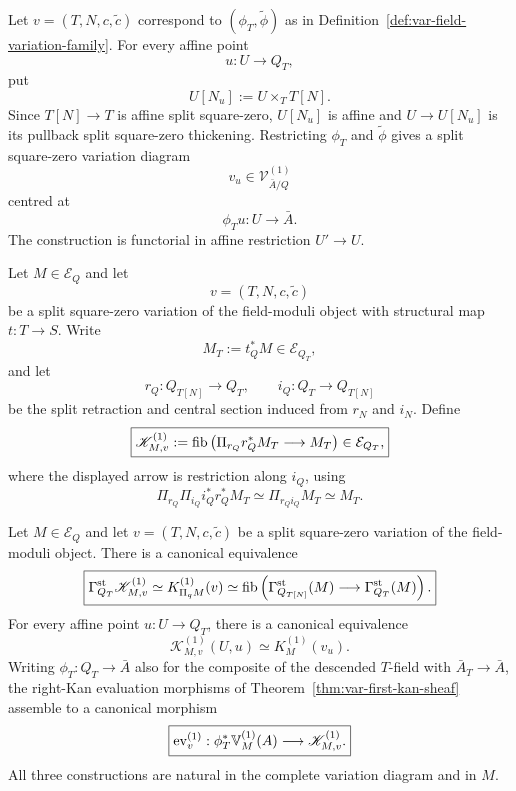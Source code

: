 \begin{construction}
\label{con:var-induced-local-field-variations}
Let \(v=(T,N,c,\widetilde c)\) correspond to \((\phi_T,\widetilde\phi)\) as in Definition~\ref{def:var-field-variation-family}. For every affine point
\[
    u:U\longrightarrow Q_T,
\]
put
\[
    U[N_u]
    :=
    U\times_TT[N].
\]
Since \(T[N]\to T\) is affine split square-zero, \(U[N_u]\) is affine and \(U\to U[N_u]\) is its pullback split square-zero thickening. Restricting \(\phi_T\) and \(\widetilde\phi\) gives a split square-zero variation diagram
\[
    \boxed{
    v_u\in\mathcal V^{(1)}_{\bar A/Q}
    }
\]
centred at
\[
    \phi_Tu:U\longrightarrow\bar A.
\]
The construction is functorial in affine restriction \(U'\to U\).
\end{construction}

\begin{definition}
\label{def:var-parameterized-first-field-difference}
Let \(M\in\mathcal E_Q\) and let
\[
    v=(T,N,c,\widetilde c)
\]
be a split square-zero variation of the field-moduli object with structural map \(t:T\to S\). Write
\[
    M_T:=t_Q^*M\in\mathcal E_{Q_T},
\]
and let
\[
    r_Q:Q_{T[N]}\longrightarrow Q_T,
    \qquad
    i_Q:Q_T\longrightarrow Q_{T[N]}
\]
be the split retraction and central section induced from \(r_N\) and \(i_N\). Define
\[
    \boxed{
    \mathscr K^{(1)}_{M,v}
    :=
    \operatorname{fib}\left(
      \Pi_{r_Q}r_Q^*M_T
      \longrightarrow
      M_T
    \right)
    \in\mathcal E_{Q_T},
    }
\]
where the displayed arrow is restriction along \(i_Q\), using
\[
    \Pi_{r_Q}\Pi_{i_Q}i_Q^*r_Q^*M_T
    \simeq
    \Pi_{r_Qi_Q}M_T
    \simeq
    M_T.
\]
\end{definition}

\begin{lemma}
\label{lem:var-first-difference-beck-chevalley}
Let \(M\in\mathcal E_Q\) and let \(v=(T,N,c,\widetilde c)\) be a split square-zero variation of the field-moduli object. There is a canonical equivalence
\[
    \boxed{
    \Gamma_{Q_T}^{\mathrm{st}}
    \mathscr K^{(1)}_{M,v}
    \simeq
    K_{\Pi_qM}^{(1)}(v)
    \simeq
    \operatorname{fib}\left(
      \Gamma_{Q_{T[N]}}^{\mathrm{st}}(M)
      \longrightarrow
      \Gamma_{Q_T}^{\mathrm{st}}(M)
    \right).
    }
\]
For every affine point \(u:U\to Q_T\), there is a canonical equivalence
\[
    \boxed{
    \mathscr K^{(1)}_{M,v}(U,u)
    \simeq
    K_M^{(1)}(v_u).
    }
\]
Writing \(\phi_T:Q_T\to\bar A\) also for the composite of the descended \(T\)-field with \(\bar A_T\to\bar A\), the right-Kan evaluation morphisms of Theorem~\ref{thm:var-first-kan-sheaf} assemble to a canonical morphism
\[
    \boxed{
    \operatorname{ev}^{(1)}_v:
    \phi_T^*\mathbb V^{(1)}_M(A)
    \longrightarrow
    \mathscr K^{(1)}_{M,v}.
    }
\]
All three constructions are natural in the complete variation diagram and in \(M\).
\end{lemma}

